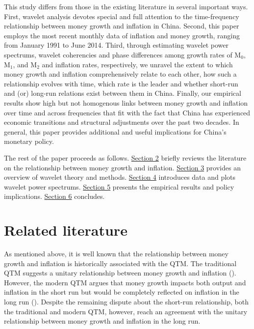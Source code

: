 \documentclass[a4paper,fleqn]{cas-sc}
\begin{document}
This study differs from those in the existing literature in several important ways. First, wavelet analysis devotes special and full attention to the time-frequency relationship between money growth and inflation in China. Second, this paper employs the most recent monthly data of inflation and money growth, ranging from January 1991 to June 2014. Third, through estimating wavelet power spectrums, wavelet coherencies and phase differences among growth rates of M$_0$, M$_1$, and M$_2$ and inflation rates, respectively, we unravel the extent to which money growth and inflation comprehensively relate to each other, how such a relationship evolves with time, which rate is the leader and whether short-run and (or) long-run relations exist between them in China. Finally, our empirical results show high but not homogenous links between money growth and inflation over time and across frequencies that fit with the fact that China has experienced economic transitions and structural adjustments over the past two decades. In general, this paper provides additional and useful implications for China's monetary policy.

The rest of the paper proceeds as follows. \hyperref[sec:2]{Section 2} briefly reviews the literature on the relationship between money growth and inflation. \hyperref[sec:3]{Section 3} provides an overview of wavelet theory and methods. \hyperref[sec:4]{Section 4} introduces data and plots wavelet power spectrums. \hyperref[sec:5]{Section 5} presents the empirical results and policy implications. \hyperref[sec:6]{Section 6} concludes.

\section{Related literature}\label{sec:2}
As mentioned above, it is well known that the relationship between money growth and inflation is historically associated with the QTM. The traditional QTM suggests a unitary relationship between money growth and inflation (\citealp{fisher1911}). However, the modern QTM argues that money growth impacts both output and inflation in the short run but would be completely reflected on inflation in the long run (\citealp{friedman1956}). Despite the remaining dispute about the short-run relationship, both the traditional and modern QTM, however, reach an agreement with the unitary relationship between money growth and inflation in the long run.
\end{document}
